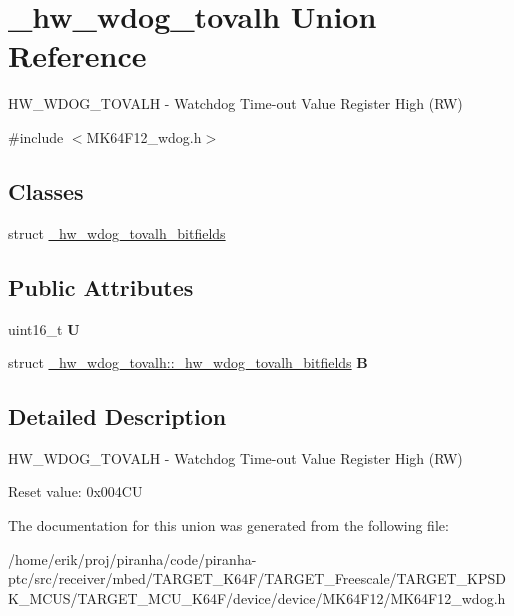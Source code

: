 \hypertarget{union__hw__wdog__tovalh}{}\section{\+\_\+hw\+\_\+wdog\+\_\+tovalh Union Reference}
\label{union__hw__wdog__tovalh}


H\+W\+\_\+\+W\+D\+O\+G\+\_\+\+T\+O\+V\+A\+LH -\/ Watchdog Time-\/out Value Register High (RW)  




{\ttfamily \#include $<$M\+K64\+F12\+\_\+wdog.\+h$>$}

\subsection*{Classes}
\begin{DoxyCompactItemize}
\item 
struct \hyperlink{struct__hw__wdog__tovalh_1_1__hw__wdog__tovalh__bitfields}{\+\_\+hw\+\_\+wdog\+\_\+tovalh\+\_\+bitfields}
\end{DoxyCompactItemize}
\subsection*{Public Attributes}
\begin{DoxyCompactItemize}
\item 
uint16\+\_\+t {\bfseries U}\hypertarget{union__hw__wdog__tovalh_ad5e0d54015632495b324d669a2faa922}{}\label{union__hw__wdog__tovalh_ad5e0d54015632495b324d669a2faa922}

\item 
struct \hyperlink{struct__hw__wdog__tovalh_1_1__hw__wdog__tovalh__bitfields}{\+\_\+hw\+\_\+wdog\+\_\+tovalh\+::\+\_\+hw\+\_\+wdog\+\_\+tovalh\+\_\+bitfields} {\bfseries B}\hypertarget{union__hw__wdog__tovalh_ae0534db4349f04449044ad0d6854048e}{}\label{union__hw__wdog__tovalh_ae0534db4349f04449044ad0d6854048e}

\end{DoxyCompactItemize}


\subsection{Detailed Description}
H\+W\+\_\+\+W\+D\+O\+G\+\_\+\+T\+O\+V\+A\+LH -\/ Watchdog Time-\/out Value Register High (RW) 

Reset value\+: 0x004\+CU 

The documentation for this union was generated from the following file\+:\begin{DoxyCompactItemize}
\item 
/home/erik/proj/piranha/code/piranha-\/ptc/src/receiver/mbed/\+T\+A\+R\+G\+E\+T\+\_\+\+K64\+F/\+T\+A\+R\+G\+E\+T\+\_\+\+Freescale/\+T\+A\+R\+G\+E\+T\+\_\+\+K\+P\+S\+D\+K\+\_\+\+M\+C\+U\+S/\+T\+A\+R\+G\+E\+T\+\_\+\+M\+C\+U\+\_\+\+K64\+F/device/device/\+M\+K64\+F12/M\+K64\+F12\+\_\+wdog.\+h\end{DoxyCompactItemize}
